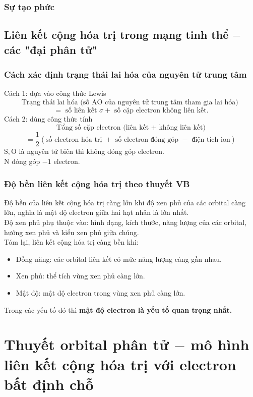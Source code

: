 \subsubsection{Sự tạo phức}
\subsection{Liên kết cộng hóa trị trong mạng tinh thể $-$ các "đại phân tử"}
\subsubsection{Cách xác định trạng thái lai hóa của nguyên tử trung tâm}
Cách 1: dựa vào công thức Lewis
$$\text{Trạng thái lai hóa (số AO của nguyên tử trung tâm tham gia lai hóa) }$$ 
$$= \text{ số liên kết } \sigma + \text{ số cặp electron không liên kết.}$$
Cách 2: dùng công thức tính
$$\text{Tổng số cặp electron (liên kết + không liên kết)}$$
$$ = \frac{1}{2} \left( {\text{số electron hóa trị } + \text{ số electron đóng góp } - \text{ điện tích ion}} \right)$$
$\mathrm{S}, \mathrm{O}$ là nguyên tử biên thì không đóng góp electron.\\
$\mathrm{N}$ đóng góp $-1$ electron.
\subsubsection{Độ bền liên kết cộng hóa trị theo thuyết VB}
Độ bền của liên kết cộng hóa trị càng lớn khi độ xen phủ của các orbital càng lớn, nghĩa là mật độ electron giữa hai hạt nhân là lớn nhất.\\
Độ xen phủ phụ thuộc vào: hình dạng, kích thước, năng lượng của các orbital, hướng xen phủ và kiểu xen phủ giữa chúng.\\
Tóm lại, liên kết cộng hóa trị càng bền khi:
\begin{itemize}
\item Đồng năng: các orbital liên kết có mức năng lượng càng gần nhau.
\item Xen phủ: thể tích vùng xen phủ càng lớn.
\item Mật độ: mật độ electron trong vùng xen phủ càng lớn.
\end{itemize}
Trong các yếu tố đó thì \textbf{mật độ electron là yếu tố quan trọng nhất.}
\section{Thuyết orbital phân tử $-$ mô hình liên kết cộng hóa trị với electron bất định chỗ}
